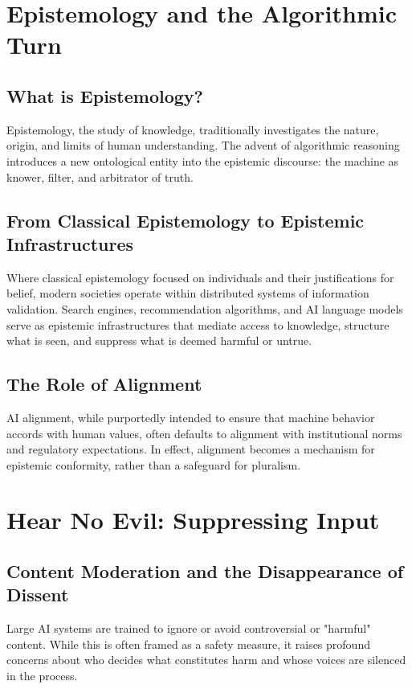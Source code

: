\documentclass[11pt]{article}
\begin{document}
\section{Epistemology and the Algorithmic Turn}
\subsection{What is Epistemology?}
Epistemology, the study of knowledge, traditionally investigates the nature, origin, and limits of human understanding. The advent of algorithmic reasoning introduces a new ontological entity into the epistemic discourse: the machine as knower, filter, and arbitrator of truth.

\subsection{From Classical Epistemology to Epistemic Infrastructures}
Where classical epistemology focused on individuals and their justifications for belief, modern societies operate within distributed systems of information validation. Search engines, recommendation algorithms, and AI language models serve as epistemic infrastructures that mediate access to knowledge, structure what is seen, and suppress what is deemed harmful or untrue.

\subsection{The Role of Alignment}
AI alignment, while purportedly intended to ensure that machine behavior accords with human values, often defaults to alignment with institutional norms and regulatory expectations. In effect, alignment becomes a mechanism for epistemic conformity, rather than a safeguard for pluralism.

\section{Hear No Evil: Suppressing Input}
\subsection{Content Moderation and the Disappearance of Dissent}
Large AI systems are trained to ignore or avoid controversial or "harmful" content. While this is often framed as a safety measure, it raises profound concerns about who decides what constitutes harm and whose voices are silenced in the process.
\end{document}
